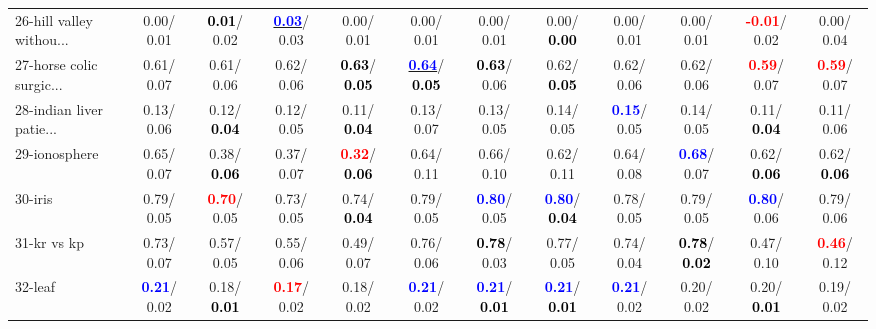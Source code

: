 \begin{table}[h]
\begin{center}
{\begin{tabular}{lc|c|c|c|c|c|c|c|c|c|c}
26-hill valley withou... &   0.00/  0.01 & \textcolor{black}{\textbf{  0.01}}/  0.02 & \underline{\textcolor{blue}{\textbf{  0.03}}}/  0.03 &   0.00/  0.01 &   0.00/  0.01 &   0.00/  0.01 &   0.00/\textcolor{black}{\textbf{  0.00}} &   0.00/  0.01 &   0.00/  0.01 & \textcolor{red}{\textbf{ -0.01}}/  0.02 &   0.00/  0.04 \\
27-horse colic surgic... &   0.61/  0.07 &   0.61/  0.06 &   0.62/  0.06 & \textcolor{black}{\textbf{  0.63}}/\textcolor{black}{\textbf{  0.05}} & \underline{\textcolor{blue}{\textbf{  0.64}}}/\textcolor{black}{\textbf{  0.05}} & \textcolor{black}{\textbf{  0.63}}/  0.06 &   0.62/\textcolor{black}{\textbf{  0.05}} &   0.62/  0.06 &   0.62/  0.06 & \textcolor{red}{\textbf{  0.59}}/  0.07 & \textcolor{red}{\textbf{  0.59}}/  0.07 \\
28-indian liver patie... &   0.13/  0.06 &   0.12/\textcolor{black}{\textbf{  0.04}} &   0.12/  0.05 &   0.11/\textcolor{black}{\textbf{  0.04}} &   0.13/  0.07 &   0.13/  0.05 &   0.14/  0.05 & \textcolor{blue}{\textbf{  0.15}}/  0.05 &   0.14/  0.05 &   0.11/\textcolor{black}{\textbf{  0.04}} &   0.11/  0.06 \\ \hline
29-ionosphere &   0.65/  0.07 &   0.38/\textcolor{black}{\textbf{  0.06}} &   0.37/  0.07 & \textcolor{red}{\textbf{  0.32}}/\textcolor{black}{\textbf{  0.06}} &   0.64/  0.11 &   0.66/  0.10 &   0.62/  0.11 &   0.64/  0.08 & \textcolor{blue}{\textbf{  0.68}}/  0.07 &   0.62/\textcolor{black}{\textbf{  0.06}} &   0.62/\textcolor{black}{\textbf{  0.06}} \\
30-iris &   0.79/  0.05 & \textcolor{red}{\textbf{  0.70}}/  0.05 &   0.73/  0.05 &   0.74/\textcolor{black}{\textbf{  0.04}} &   0.79/  0.05 & \textcolor{blue}{\textbf{  0.80}}/  0.05 & \textcolor{blue}{\textbf{  0.80}}/\textcolor{black}{\textbf{  0.04}} &   0.78/  0.05 &   0.79/  0.05 & \textcolor{blue}{\textbf{  0.80}}/  0.06 &   0.79/  0.06 \\
31-kr vs kp &   0.73/  0.07 &   0.57/  0.05 &   0.55/  0.06 &   0.49/  0.07 &   0.76/  0.06 & \textcolor{black}{\textbf{  0.78}}/  0.03 &   0.77/  0.05 &   0.74/  0.04 & \textcolor{black}{\textbf{  0.78}}/\textcolor{black}{\textbf{  0.02}} &   0.47/  0.10 & \textcolor{red}{\textbf{  0.46}}/  0.12 \\
32-leaf & \textcolor{blue}{\textbf{  0.21}}/  0.02 &   0.18/\textcolor{black}{\textbf{  0.01}} & \textcolor{red}{\textbf{  0.17}}/  0.02 &   0.18/  0.02 & \textcolor{blue}{\textbf{  0.21}}/  0.02 & \textcolor{blue}{\textbf{  0.21}}/\textcolor{black}{\textbf{  0.01}} & \textcolor{blue}{\textbf{  0.21}}/\textcolor{black}{\textbf{  0.01}} & \textcolor{blue}{\textbf{  0.21}}/  0.02 &   0.20/  0.02 &   0.20/\textcolor{black}{\textbf{  0.01}} &   0.19/  0.02 \\\end{tabular}
}\label{strats0bC4.5w}
\end{center}
\end{table}
